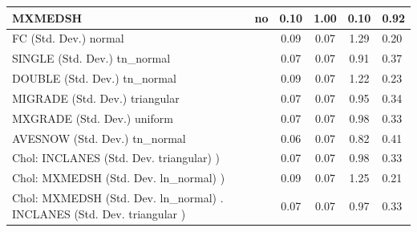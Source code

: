 \begin{table}
\begin{center}
\begin{tabular}{|l|l|c|c|c|l|}
			MXMEDSH & no & 0.10 & 1.00 & 0.10 & 0.92 \\
			\hline
			FC (Std. Dev.) normal &  & 0.09 & 0.07 & 1.29 & 0.20 \\
			\hline
			SINGLE (Std. Dev.) tn_normal &  & 0.07 & 0.07 & 0.91 & 0.37 \\
			\hline
			DOUBLE (Std. Dev.) tn_normal &  & 0.09 & 0.07 & 1.22 & 0.23 \\
			\hline
			MIGRADE (Std. Dev.) triangular &  & 0.07 & 0.07 & 0.95 & 0.34 \\
			\hline
			MXGRADE (Std. Dev.) uniform &  & 0.07 & 0.07 & 0.98 & 0.33 \\
			\hline
			AVESNOW (Std. Dev.) tn_normal &  & 0.06 & 0.07 & 0.82 & 0.41 \\
			\hline
			 Chol: INCLANES (Std. Dev. triangular) ) &  & 0.07 & 0.07 & 0.98 & 0.33 \\
			\hline
			 Chol: MXMEDSH (Std. Dev. ln_normal) ) &  & 0.09 & 0.07 & 1.25 & 0.21 \\
			\hline
			 Chol: MXMEDSH (Std. Dev. ln_normal) . INCLANES (Std. Dev.   triangular ) &  & 0.07 & 0.07 & 0.97 & 0.33 \\
			\hline
		\end{tabular}
	\end{center}
\end{table}